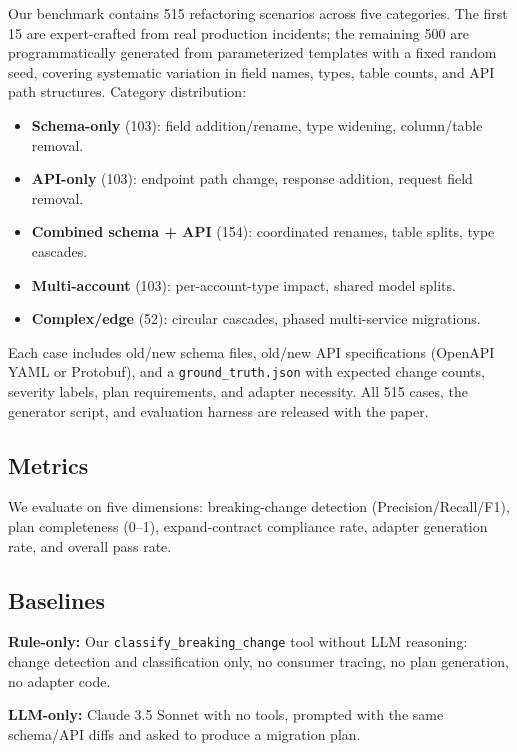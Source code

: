 \documentclass[10pt,twocolumn]{article}
\begin{document}
Our benchmark contains 515 refactoring scenarios across five categories.
The first 15 are expert-crafted from real production incidents;
the remaining 500 are programmatically generated from parameterized templates
with a fixed random seed, covering systematic variation in field names, types,
table counts, and API path structures. Category distribution:

\begin{itemize}[leftmargin=*,itemsep=1pt,topsep=2pt]
  \item \textbf{Schema-only} (103): field addition/rename, type widening, column/table removal.
  \item \textbf{API-only} (103): endpoint path change, response addition, request field removal.
  \item \textbf{Combined schema + API} (154): coordinated renames, table splits, type cascades.
  \item \textbf{Multi-account} (103): per-account-type impact, shared model splits.
  \item \textbf{Complex/edge} (52): circular cascades, phased multi-service migrations.
\end{itemize}

Each case includes old/new schema files, old/new API specifications (OpenAPI YAML
or Protobuf), and a \texttt{ground\_truth.json} with expected change counts,
severity labels, plan requirements, and adapter necessity. All 515 cases,
the generator script, and evaluation harness are released with the paper.

\subsection{Metrics}

We evaluate on five dimensions: breaking-change detection
(Precision/Recall/F1), plan completeness (0--1), expand-contract compliance
rate, adapter generation rate, and overall pass rate.

\subsection{Baselines}

\textbf{Rule-only:} Our \texttt{classify\_breaking\_change} tool without LLM
reasoning: change detection and classification only, no consumer tracing, no
plan generation, no adapter code.

\textbf{LLM-only:} Claude 3.5 Sonnet with no tools, prompted with the same
schema/API diffs and asked to produce a migration plan.
\end{document}

